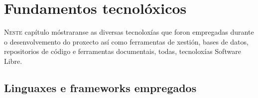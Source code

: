 \chapter{Fundamentos tecnolóxicos}
\minitoc


  \lettrine{N}{este} capítulo móstraranse as diversas tecnoloxías que foron 
empregadas durante o desenvolvemento do proxecto así como ferramentas de 
xestión, bases de datos, repositorios de código e ferramentas documentais, 
todas, tecnoloxías Software Libre.

  \section{Linguaxes e frameworks empregados}

